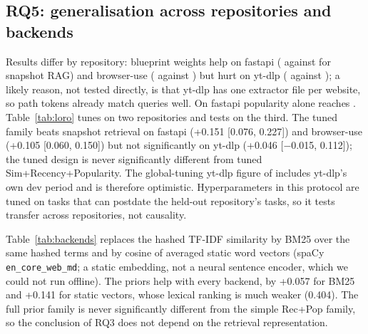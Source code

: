 \documentclass[runningheads]{llncs}
\newcommand{\sys}{EmemoVeri}
\begin{document}
\subsection{RQ5: generalisation across repositories and backends}
Results differ by repository: blueprint weights help on fastapi (\repFastEmv{} against \repFastSnap{} for snapshot RAG) and browser-use (\repBuEmv{} against \repBuSnap{}) but hurt on yt-dlp (\repYtdlpEmv{} against \repYtdlpSnap{}); a likely reason, not tested directly, is that yt-dlp has one extractor file per website, so path tokens already match queries well. On fastapi popularity alone reaches \repFastPop{}. Table~\ref{tab:loro} tunes on two repositories and tests on the third. The tuned family beats snapshot retrieval on fastapi (+0.151 [0.076, 0.227]) and browser-use (+0.105 [0.060, 0.150]) but not significantly on yt-dlp (+0.046 [$-$0.015, 0.112]); the tuned design is never significantly different from tuned Sim+Recency+Popularity. The global-tuning yt-dlp figure of \repYtdlpTuned{} includes yt-dlp's own dev period and is therefore optimistic. Hyperparameters in this protocol are tuned on tasks that can postdate the held-out repository's tasks, so it tests transfer across repositories, not causality.

\begin{table}[t]\centering\footnotesize\setlength{\tabcolsep}{3pt}
\resizebox{\linewidth}{!}{}
\caption{Leave-one-repository-out Hit@5 on test-split tasks of the held-out repository (95\% task-bootstrap intervals). \sys{}-LORO: published weight grid tuned on the other two repositories; RP-LORO: Sim+State+Rec+Pop grid tuned likewise.}
\label{tab:loro}
\end{table}

Table~\ref{tab:backends} replaces the hashed TF-IDF similarity by BM25 over the same hashed terms and by cosine of averaged static word vectors (spaCy \texttt{en\_core\_web\_md}; a static embedding, not a neural sentence encoder, which we could not run offline). The priors help with every backend, by +0.057 for BM25 and +0.141 for static vectors, whose lexical ranking is much weaker (0.404). The full prior family is never significantly different from the simple Rec+Pop family, so the conclusion of RQ3 does not depend on the retrieval representation.

\begin{table}[t]\centering\footnotesize\setlength{\tabcolsep}{3pt}
\resizebox{\linewidth}{!}{}
\caption{Hit@5 by retrieval backend. Full: frequency, evidence, trust and recency priors; SSRP: Sim+State+Rec+Pop; both tuned on dev for each backend.}
\label{tab:backends}
\end{table}
\end{document}
